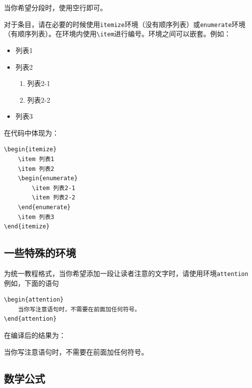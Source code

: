 当你希望分段时，使用空行即可。

对于条目，请在必要的时候使用\verb|itemize|环境（没有顺序列表）或\verb|enumerate|环境（有顺序列表）。在环境内使用\verb|\item|进行编号。环境之间可以嵌套。例如：

\begin{itemize}
    \item 列表1
    \item 列表2
    \begin{enumerate}
        \item 列表2-1
        \item 列表2-2
    \end{enumerate}
    \item 列表3
\end{itemize}

在代码中体现为：

\begin{lstlisting}[frame=line]
\begin{itemize}
    \item 列表1
    \item 列表2
    \begin{enumerate}
        \item 列表2-1
        \item 列表2-2
    \end{enumerate}
    \item 列表3
\end{itemize}
\end{lstlisting}

\subsection{一些特殊的环境}\label{subsec:关于如何编写模板（教程）-一些特殊的环境}

为统一教程格式，当你希望添加一段让读者注意的文字时，请使用环境\verb|attention|例如，下面的语句

\begin{lstlisting}[frame=line]
\begin{attention}
    当你写注意语句时，不需要在前面加任何符号。
\end{attention}
\end{lstlisting}
在编译后的结果为：

\begin{attention}
    当你写注意语句时，不需要在前面加任何符号。
\end{attention}

\subsection{数学公式}\label{subsec:关于如何编写模板（教程）-数学公式}

